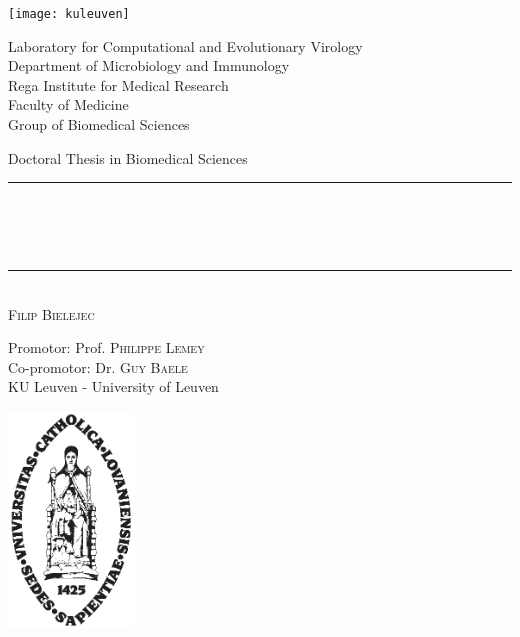 \begin{titlepage}
	\begin{addmargin}[-1cm]{-3cm}
    \begin{center}
    
    
    \texttt{[image: kuleuven]}
    
    
        \large
        Laboratory for Computational and Evolutionary Virology\\ 
        Department of Microbiology and Immunology\\        
        Rega Institute for Medical Research\\
        Faculty of Medicine\\
        Group of Biomedical Sciences\\

        \vfill

        Doctoral Thesis in Biomedical Sciences\\ \vskip1cm
        \rule{11cm}{0.4pt}\\ \bigskip
        \begingroup
            \Large
            \color{maroon}\spacedallcaps{\myTitle} \\ \bigskip
        \endgroup
        \spacedlowsmallcaps{\mySubtitle} \\ \bigskip
        \rule{11cm}{0.4pt}\\ \vskip1cm
        \textsc{Filip Bielejec}

        \vfill
        \vfill
        \vfill

        \hfill Promotor: Prof. \textsc{Philippe Lemey}\\
        \hfill Co-promotor: Dr. \textsc{Guy Baele}\\
        \hfill KU Leuven - University of Leuven\\
        \hfill {}
    \end{center}
    \vspace{-3.5cm}\includegraphics[width=0.25\textwidth]{figures/sedes}
  \end{addmargin}
\end{titlepage}
